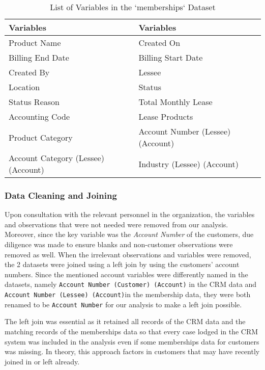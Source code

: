 \documentclass[
]{article}
\begin{document}
\begin{table}

\caption{\label{tab:var-table-member}List of Variables in the `memberships` Dataset}
\centering
\begin{tabular}[t]{l|l}
\hline
Variables & Variables\\
\hline
Product Name & Created On\\
\hline
Billing End Date & Billing Start Date\\
\hline
Created By & Lessee\\
\hline
Location & Status\\
\hline
Status Reason & Total Monthly Lease\\
\hline
Accounting Code & Lease Products\\
\hline
Product Category & Account Number (Lessee) (Account)\\
\hline
Account Category (Lessee) (Account) & Industry (Lessee) (Account)\\
\hline
\end{tabular}
\end{table}

\subsubsection{Data Cleaning and Joining}\label{data-cleaning-and-joining}

Upon consultation with the relevant personnel in the organization, the variables and observations that were not needed were removed from our analysis. Moreover, since the key variable was the \emph{Account Number} of the customers, due diligence was made to ensure blanks and non-customer observations were removed as well. When the irrelevant observations and variables were removed, the 2 datasets were joined using a left join by using the customers' account numbers. Since the mentioned account variables were differently named in the datasets, namely \texttt{Account\ Number\ (Customer)\ (Account)} in the CRM data and \texttt{Account\ Number\ (Lessee)\ (Account)}in the membership data, they were both renamed to be \texttt{Account\ Number} for our analysis to make a left join possible.

The left join was essential as it retained all records of the CRM data and the matching records of the memberships data so that every case lodged in the CRM system was included in the analysis even if some memberships data for customers was missing. In theory, this approach factors in customers that may have recently joined in or left already.
\end{document}
